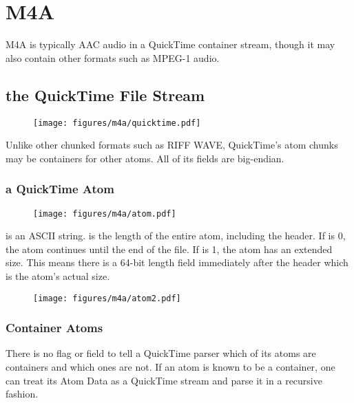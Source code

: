
\chapter{M4A}
\label{m4a}
M4A is typically AAC audio in a QuickTime container stream, though
it may also contain other formats such as MPEG-1 audio.

\section{the QuickTime File Stream}
\begin{figure}[h]
\texttt{[image: figures/m4a/quicktime.pdf]}
\end{figure}
\par
\noindent
Unlike other chunked formats such as RIFF WAVE, QuickTime's atom chunks
may be containers for other atoms.  All of its fields are big-endian.
\subsection{a QuickTime Atom}
\begin{figure}[h]
\texttt{[image: figures/m4a/atom.pdf]}
\end{figure}
 is an ASCII string.
 is the length of the entire atom, including the header.
If  is 0, the atom continues until the end of the file.
If  is 1, the atom has an extended size.  This means
there is a 64-bit length field immediately after the header which is
the atom's actual size.
\begin{figure}[h]
\texttt{[image: figures/m4a/atom2.pdf]}
\end{figure}
\subsection{Container Atoms}
There is no flag or field to tell a QuickTime parser which
of its atoms are containers and which ones are not.
If an atom is known to be a container, one can treat its Atom Data
as a QuickTime stream and parse it in a recursive fashion.

\clearpage

